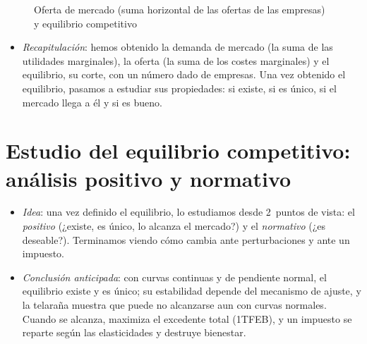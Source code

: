 \documentclass[11pt]{article}
\begin{document}
\begin{figure}[H]
\centering
\caption{Oferta de mercado (suma horizontal de las ofertas de las empresas) y equilibrio competitivo}\label{fig:equilibrio}
\end{figure}

\begin{itemize}
\item \emph{Recapitulación}: hemos obtenido la demanda de mercado (la suma de las utilidades marginales), la oferta (la suma de los costes marginales) y el equilibrio, su corte, con un número dado de empresas. Una vez obtenido el equilibrio, pasamos a estudiar sus propiedades: si existe, si es único, si el mercado llega a él y si es bueno.
\end{itemize}


\section{Estudio del equilibrio competitivo:\cortetitulo{} análisis positivo y normativo}\label{sec:estudio-equilibrio-competitivo}

\begin{itemize}
\item \emph{Idea}: una vez definido el equilibrio, lo estudiamos desde 2~puntos de vista: el \emph{positivo} (¿existe, es único, lo alcanza el mercado?) y el \emph{normativo} (¿es deseable?). Terminamos viendo cómo cambia ante perturbaciones y ante un impuesto.
\item \emph{Conclusión anticipada}: con curvas continuas y de pendiente normal, el equilibrio existe y es único; su estabilidad depende del mecanismo de ajuste, y la telaraña muestra que puede no alcanzarse aun con curvas normales. Cuando se alcanza, maximiza el excedente total (1TFEB), y un impuesto se reparte según las elasticidades y destruye bienestar.
\end{itemize}
\end{document}
